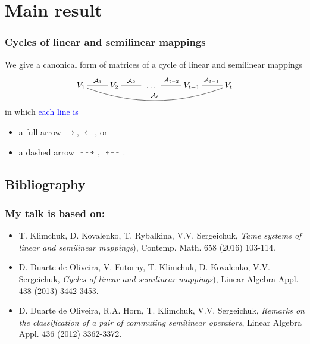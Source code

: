 \documentclass[usenames,dvipsnames]{beamer}
\renewcommand{\dashrightarrow}
{\text{\raisebox{0.9mm} {\
\begin{tikzpicture}[->,thick,xscale=0.56]
  \draw[dashed] (0,0)--(1,0)
;
\end{tikzpicture}}\ }}
\renewcommand{\dashleftarrow}
{\text{\raisebox{0.9mm} {\
\begin{tikzpicture}[<-,thick,xscale=0.56]
  \draw[dashed] (0,0)--(1,0)
;
\end{tikzpicture}}\ }}
\begin{document}
\section{Main result}
\begin{frame}[t]
\frametitle{Cycles of linear and
semilinear mappings}


We give a canonical form of matrices of
a \alert{cycle of linear and semilinear
mappings}
\[
\xymatrix{
{V_1}
\ar@{-}@/_1.5pc/[rrrr]^{\mathcal A_t}
\ar@{-}[r]^{\mathcal A_1}&
V_2\ar@{-}[r]^{\mathcal A_2\ } &
{\ \dots\ }&{V_{t-1}}
\ar@{-}[l]_{\mathcal A_{t-2}}
\ar@{-}[r]^{\ \mathcal A_{t-1}}&{V_t}}
\]
in which \textcolor{blue}{each line is}
\begin{itemize}
  \item a full arrow
      \alert{$\longrightarrow$},
      \alert{$\longleftarrow$}, or
  \item a dashed arrow
      \alert{$\dashrightarrow$},
      \alert{$\dashleftarrow$}.
\end{itemize}


\end{frame}


\subsection{Bibliography}
\begin{frame}[t]
\frametitle{My talk is based on:}

\begin{itemize}

  \item \alert{T. Klimchuk,
  D. Kovalenko, T. Rybalkina,
  V.V. Sergeichuk}, {\it Tame systems
  of linear and semilinear mappings}),
   Contemp. Math. 658 (2016) 103-114.
\bigskip
\bigskip


  \item \alert{D. Duarte de
      Oliveira, V. Futorny, T.
      Klimchuk, D. Kovalenko, V.V.
      Sergeichuk}, {\it Cycles of
      linear and semilinear
      mappings}), Linear Algebra
      Appl. 438 (2013) 3442-3453.
\bigskip
\bigskip

  \item \alert{D. Duarte de
      Oliveira, R.A. Horn, T.
      Klimchuk, V.V. Sergeichuk},
      {\it Remarks on the
      classification of a pair of
      commuting semilinear
      operators}, Linear Algebra
      Appl. 436 (2012) 3362-3372.



\end{itemize}



\end{frame}
\end{document}
